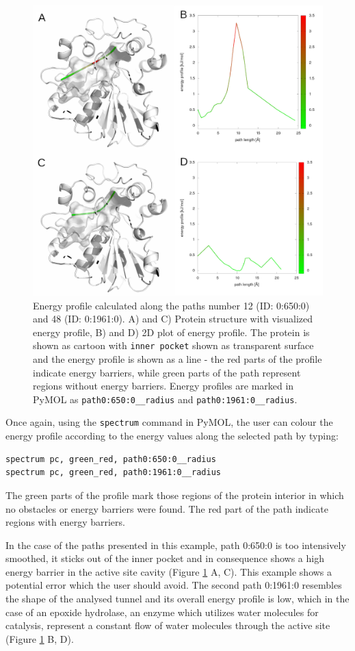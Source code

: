 \documentclass[9pt,tutorial]{livecoms}
\begin{document}
\begin{figure}[ht!]
\centering
\includegraphics{Tut4.5.png}
\caption{Energy profile calculated along the paths number 12 (ID: 0:650:0) and 48 (ID: 0:1961:0). A) and C) Protein structure with visualized energy profile, B) and D) 2D plot of energy profile. The protein is shown as cartoon with \texttt{inner pocket} shown as transparent surface and the energy profile is shown as a line - the red parts of the profile indicate energy barriers, while green parts of the path represent regions without energy barriers. Energy profiles are marked in PyMOL as \texttt{path0:650:0\_\_radius} and \texttt{path0:1961:0\_\_radius}.}
\label{Tut4.5}
\end{figure}

Once again, using the \texttt{spectrum} command in PyMOL, the user can colour the energy profile according to the energy values along the selected path by typing:
\begin{lstlisting}
spectrum pc, green_red, path0:650:0__radius
spectrum pc, green_red, path0:1961:0__radius
\end{lstlisting}
The green parts of the profile mark those regions of the protein interior in which no obstacles or energy barriers were found. The red part of the path indicate regions with energy barriers. 

In the case of the paths presented in this example, path 0:650:0 is too intensively smoothed, it sticks out of the inner pocket and in consequence shows a high energy barrier in the active site cavity (Figure \ref{Tut4.5} A, C). This example shows a potential error which the user should avoid. 
The second path 0:1961:0 resembles the shape of the analysed tunnel and its overall energy profile is low, which in the case of an epoxide hydrolase, an enzyme which utilizes water molecules for catalysis, represent a constant flow of water molecules through the active site (Figure \ref{Tut4.5} B, D).
\end{document}
